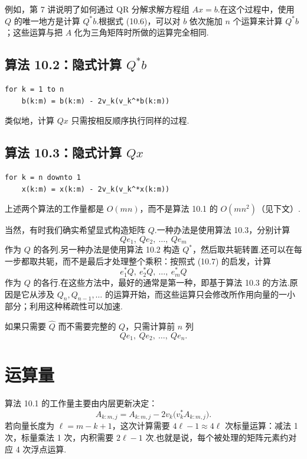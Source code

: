 \documentclass[UTF8,fontset=none,12pt]{ctexart}
\begin{document}
例如，第 7 讲说明了如何通过 QR 分解求解方程组 $Ax=b$.在这个过程中，使用 $Q$ 的唯一地方是计算 $Q^*b$.根据式 (10.6)，可以对 $b$ 依次施加 $n$ 个运算来计算 $Q^*b$；这些运算与把 $A$ 化为三角矩阵时所做的运算完全相同.

\subsection*{算法 10.2：隐式计算 $Q^*b$}

\begin{verbatim}
for k = 1 to n
    b(k:m) = b(k:m) - 2v_k(v_k^*b(k:m))
\end{verbatim}

类似地，计算 $Qx$ 只需按相反顺序执行同样的过程.

\subsection*{算法 10.3：隐式计算 $Qx$}

\begin{verbatim}
for k = n downto 1
    x(k:m) = x(k:m) - 2v_k(v_k^*x(k:m))
\end{verbatim}

上述两个算法的工作量都是 $O(mn)$，而不是算法 10.1 的 $O(mn^2)$（见下文）.

当然，有时我们确实希望显式构造矩阵 $Q$.一种办法是使用算法 10.3，分别计算
\[
    Qe_1,\ Qe_2,\ \ldots,\ Qe_m
\]
作为 $Q$ 的各列.另一种办法是使用算法 10.2 构造 $Q^*$，然后取共轭转置.还可以在每一步都取共轭，而不是最后才处理整个乘积：按照式 (10.7) 的启发，计算
\[
    e_1^*Q,\ e_2^*Q,\ \ldots,\ e_m^*Q
\]
作为 $Q$ 的各行.在这些方法中，最好的通常是第一种，即基于算法 10.3 的方法.原因是它从涉及 $Q_n,Q_{n-1},\ldots$ 的运算开始，而这些运算只会修改所作用向量的一小部分；利用这种稀疏性可以加速.

如果只需要 $\widehat Q$ 而不需要完整的 $Q$，只需计算前 $n$ 列
\[
    Qe_1,\ Qe_2,\ \ldots,\ Qe_n.
\]

\section*{运算量}

算法 10.1 的工作量主要由内层更新决定：
\begin{equation}
    A_{k:m,j}
    =
    A_{k:m,j}-2v_k\bigl(v_k^*A_{k:m,j}\bigr).
    \tag{10.8}
\end{equation}
若向量长度为 $\ell=m-k+1$，这次计算需要 $4\ell-1\approx4\ell$ 次标量运算：减法 1 次，标量乘法 1 次，内积需要 $2\ell-1$ 次.也就是说，每个被处理的矩阵元素约对应 4 次浮点运算.
\end{document}
